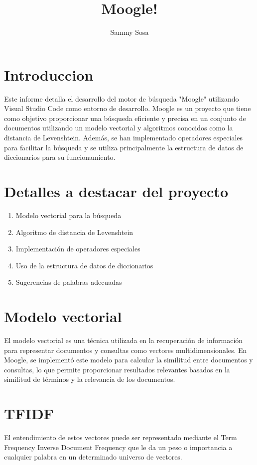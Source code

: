 \documentclass{article}
\author{Sammy Sosa}
\title{Moogle!}
\begin{document}
\maketitle


\section{Introduccion} 
Este informe detalla el desarrollo del motor de búsqueda "Moogle" utilizando Visual Studio Code como entorno de desarrollo. Moogle es un proyecto que tiene como objetivo proporcionar una búsqueda eficiente y precisa en un conjunto de documentos utilizando un modelo vectorial y algoritmos conocidos como la distancia de Levenshtein. Además, se han implementado operadores especiales para facilitar la búsqueda y se utiliza principalmente la estructura de datos de diccionarios para su funcionamiento.


\section{Detalles a destacar del proyecto}
\begin{enumerate}
  \item Modelo vectorial para la búsqueda
  \item Algoritmo de distancia de Levenshtein
  \item Implementación de operadores especiales
  \item Uso de la estructura de datos de diccionarios
  \item Sugerencias de palabras adecuadas
\end{enumerate}


\newpage 
\section*{Modelo vectorial}
El modelo vectorial es una técnica utilizada en la recuperación de información para representar documentos y consultas como vectores multidimensionales. En Moogle, se implementó este modelo para calcular la similitud entre documentos y consultas, lo que permite proporcionar resultados relevantes basados en la similitud de términos y la relevancia de los documentos.


\section*{TFIDF}
El entendimiento de estos vectores puede ser representado mediante el Term Frequency Inverse Document Frequency que le da un peso o importancia a cualquier palabra en un determinado universo de vectores.
\end{document}
